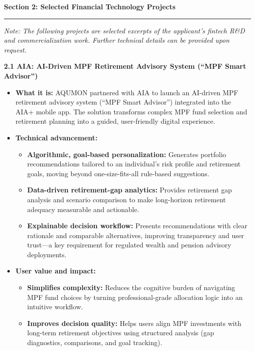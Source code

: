 \documentclass[11pt]{article}
\newcommand{\CVSection}[1]{\vspace{6pt}\textbf{\large #1}\par\vspace{2pt}\hrule\vspace{6pt}}
\newcommand{\CVSubsection}[1]{\textbf{#1}\par}
\newenvironment{tightitemize}{%
  \begin{itemize}[leftmargin=*,nosep,topsep=2pt]
}{\end{itemize}}
\begin{document}
\CVSection{Section 2: Selected Financial Technology Projects}

\noindent\textit{Note: The following projects are selected excerpts of the applicant’s fintech R\&D and commercialization work. Further technical details can be provided upon request.}

\CVSubsection{2.1 AIA: AI-Driven MPF Retirement Advisory System (``MPF Smart Advisor'')}

\begin{tightitemize}
  \item \textbf{What it is:} AQUMON partnered with AIA to launch an AI-driven MPF retirement advisory system (``MPF Smart Advisor'') integrated into the AIA+ mobile app. The solution transforms complex MPF fund selection and retirement planning into a guided, user-friendly digital experience.
  \item \textbf{Technical advancement:}
  \begin{tightitemize}
    \item \textbf{Algorithmic, goal-based personalization:} Generates portfolio recommendations tailored to an individual’s risk profile and retirement goals, moving beyond one-size-fits-all rule-based suggestions.
    \item \textbf{Data-driven retirement-gap analytics:} Provides retirement gap analysis and scenario comparison to make long-horizon retirement adequacy measurable and actionable.
    \item \textbf{Explainable decision workflow:} Presents recommendations with clear rationale and comparable alternatives, improving transparency and user trust---a key requirement for regulated wealth and pension advisory deployments.
  \end{tightitemize}
  \item \textbf{User value and impact:}
  \begin{tightitemize}
    \item \textbf{Simplifies complexity:} Reduces the cognitive burden of navigating MPF fund choices by turning professional-grade allocation logic into an intuitive workflow.
    \item \textbf{Improves decision quality:} Helps users align MPF investments with long-term retirement objectives using structured analysis (gap diagnostics, comparisons, and goal tracking).

\end{tightitemize}
\end{tightitemize}
\end{document}
